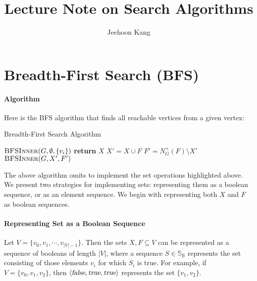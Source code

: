 \documentclass[11pt,a4paper,oneside,microtype,nokorean]{oblivoir}
\newcommand{\kwtrue}{\textsl{true}}
\newcommand{\kwfalse}{\textsl{false}}
\begin{document}
\title{Lecture Note on Search Algorithms}
\author{Jeehoon Kang}
\maketitle

\section{Breadth-First Search (BFS)}

\paragraph{Algorithm}

Here is the BFS algorithm that finds all reachable vertices from a given vertex:

\begin{algorithm}
  \caption{Breadth-First Search Algorithm}\label{bfs}
  \begin{algorithmic}[1]
     
    \State $\Call{BFSInner}{G,\emptyset,\{v_i\}}$
    \EndProcedure
    \Statex
     
     
    \State \textbf{return} $X$
    \EndIf
    \State $X' = X \cup F$ 
    \State $F' = N^+_G(F) \setminus X'$ 
    \State $\Call{BFSInner}{G,X',F'}$
    \EndProcedure
  \end{algorithmic}
\end{algorithm}

The above algorithm omits to implement the set operations highlighted above.  We present two
strategies for implementing sets: representing them as a boolean sequence, or as an element
sequence.  We begin with representing both $X$ and $F$ as boolean sequences.


\paragraph{Representing Set as a Boolean Sequence}

Let $V = \{v_0,v_1,\cdots,v_{|V|-1}\}$.  Then the sets $X, F \subseteq V$ can be represented as a
sequence of booleans of length $|V|$, where a sequence $S \in \mathbb{S}_{\mathbb{B}}$ represents
the set consisting of those elements $v_i$ for which $S_i$ is true.  For example, if
$V = \{v_0,v_1,v_2\}$, then $\langle \kwfalse, \kwtrue, \kwtrue \rangle$ represents the set
$\{v_1,v_2\}$.
\end{document}

